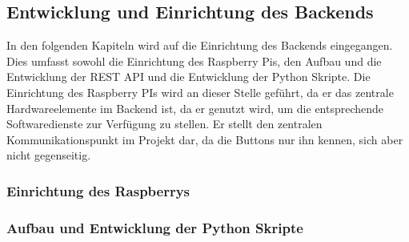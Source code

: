 \newpage

\subsection{Entwicklung und Einrichtung des Backends}  
\label{sec:Entwicklung und Einrichtung des Backends-1} 

In den folgenden Kapiteln wird auf die Einrichtung des Backends eingegangen. Dies umfasst sowohl die Einrichtung des Raspberry Pis, den Aufbau und die Entwicklung der REST API und die Entwicklung der Python Skripte. Die Einrichtung des Raspberry PIs wird an dieser Stelle geführt, da er das zentrale Hardwareelemente im Backend ist, da er genutzt wird, um die entsprechende Softwaredienste zur Verfügung zu stellen. Er stellt den zentralen Kommunikationspunkt im Projekt dar, da die Buttons nur ihn kennen, sich aber nicht gegenseitig. 

\subsubsection{Einrichtung des Raspberrys}  
\label{sec:Einrichtung des Raspberrys-1}





\subsubsection{Aufbau und Entwicklung der Python Skripte}  
\label{sec:Aufbau und Entwicklung der Python Skripte-1}



\newpage